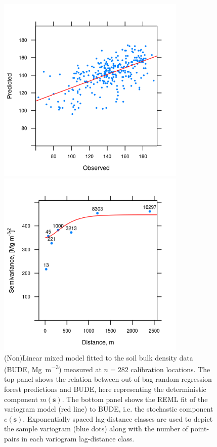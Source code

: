 \begin{figure}[!ht]
 \centering
 \begin{minipage}{90mm}
  \subcaption{}
  \centering
  \includegraphics[width = 90mm]{fig/chap07-random-forest-fit}
 \end{minipage}
 \begin{minipage}{90mm}
  \centering
  \subcaption{}
  \includegraphics[width = 90mm]{fig/chap07-bude-vario}
 \end{minipage}
 \caption[(Non)Linear mixed model fitted to the soil bulk density data.]{(Non)Linear mixed model fitted to the 
 soil bulk density data (BUDE, \si{\mega\gram\per\cubic\metre}) measured at $n = 282$ calibration locations. 
 The top panel shows the relation between out-of-bag random regression forest predictions and BUDE, here
 representing the deterministic component $m(\boldsymbol{s})$. The bottom panel shows the REML fit of the 
 variogram model (red line) to BUDE, i.e. the stochastic component $e(\boldsymbol{s})$. Exponentially spaced
 lag-distance classes are used to depict the sample variogram (blue dots) along with the number of point-pairs
 in each variogram lag-distance class.}
 \label{fig:chap07-bude-vario}
\end{figure}

